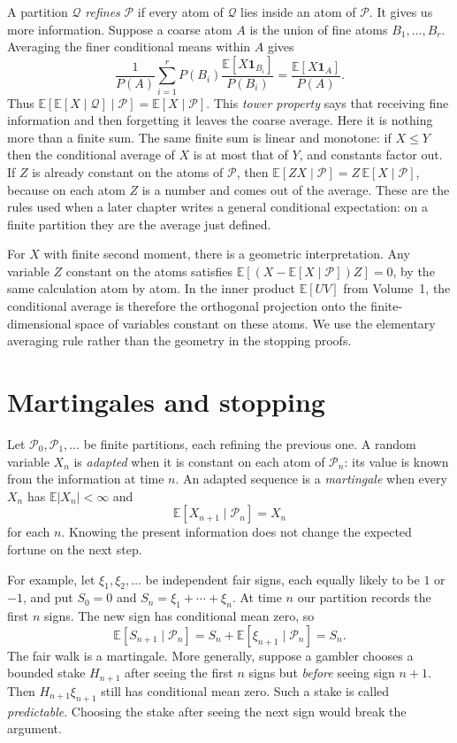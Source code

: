 A partition $\mathcal Q$ \emph{refines} $\mathcal P$ if every atom of $\mathcal Q$ lies inside an atom of $\mathcal P$. It gives us more information. Suppose a coarse atom $A$ is the union of fine atoms $B_1,\ldots,B_r$. Averaging the finer conditional means within $A$ gives
\[
 \frac1{P(A)}\sum_{i=1}^r P(B_i)
 \frac{\mathbb E[X\mathbf1_{B_i}]}{P(B_i)}
 =\frac{\mathbb E[X\mathbf1_A]}{P(A)}.
\]
Thus $\mathbb E[\mathbb E[X\mid\mathcal Q]\mid\mathcal P]
=\mathbb E[X\mid\mathcal P]$. This \emph{tower property} says that receiving fine information and then forgetting it leaves the coarse average. Here it is nothing more than a finite sum. The same finite sum is linear and monotone: if $X\le Y$ then the conditional average of $X$ is at most that of $Y$, and constants factor out. If $Z$ is already constant on the atoms of $\mathcal P$, then $\mathbb E[ZX\mid\mathcal P]=Z\,\mathbb E[X\mid\mathcal P]$, because on each atom $Z$ is a number and comes out of the average. These are the rules used when a later chapter writes a general conditional expectation: on a finite partition they are the average just defined.

For $X$ with finite second moment, there is a geometric interpretation. Any variable $Z$ constant on the atoms satisfies $\mathbb E[(X-\mathbb E[X\mid\mathcal P])Z]=0$, by the same calculation atom by atom. In the inner product $\mathbb E[UV]$ from Volume~1, the conditional average is therefore the orthogonal projection onto the finite-dimensional space of variables constant on these atoms. We use the elementary averaging rule rather than the geometry in the stopping proofs.

\section{Martingales and stopping}

\begin{definition}[martingale]\label{def:mart}
Let $\mathcal P_0,\mathcal P_1,\ldots$ be finite partitions, each refining the previous one. A random variable $X_n$ is \emph{adapted} when it is constant on each atom of $\mathcal P_n$: its value is known from the information at time $n$. An adapted sequence is a \emph{martingale} when every $X_n$ has $\mathbb E|X_n|<\infty$ and
\[
 \mathbb E[X_{n+1}\mid\mathcal P_n]=X_n
\]
for each $n$. Knowing the present information does not change the expected fortune on the next step.
\end{definition}

For example, let $\xi_1,\xi_2,\ldots$ be independent fair signs, each equally likely to be $1$ or $-1$, and put $S_0=0$ and $S_n=\xi_1+\cdots+\xi_n$. At time $n$ our partition records the first $n$ signs. The new sign has conditional mean zero, so
\[
 \mathbb E[S_{n+1}\mid\mathcal P_n]
 =S_n+\mathbb E[\xi_{n+1}\mid\mathcal P_n]=S_n.
\]
The fair walk is a martingale. More generally, suppose a gambler chooses a bounded stake $H_{n+1}$ after seeing the first $n$ signs but \emph{before} seeing sign $n+1$. Then $H_{n+1}\xi_{n+1}$ still has conditional mean zero. Such a stake is called \emph{predictable}. Choosing the stake after seeing the next sign would break the argument.

